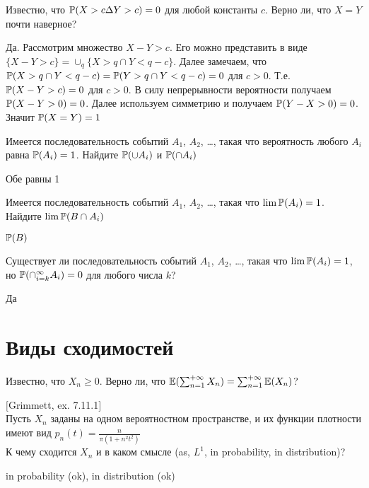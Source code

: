 \begin{problem}
Известно, что $ \P(X>c \Delta Y>c)=0 $ для любой константы $ c $. Верно ли, что $X=Y$ почти наверное?
\end{problem} 
\begin{solution} 
Да. Рассмотрим множество $ X-Y>c $. Его можно представить в виде $ \{X-Y>c\}=\cup_{q} \{ X>q \cap Y<q-c\} $. Далее замечаем, что $ \P(X>q \cap Y<q-c)=\P(Y>q \cap Y<q-c)=0 $ для $ c>0 $. Т.е. $ \P(X-Y>c)=0 $ для $ c>0 $. В силу непрерывности вероятности получаем $ \P(X-Y>0)=0 $. Далее используем симметрию и получаем $ \P(Y-X>0)=0 $. Значит $ \P(X=Y)=1 $
\end{solution}

\begin{problem}
Имеется последовательность событий $A_1$, $A_2$, \ldots, такая что вероятность любого $A_i$ равна $\P(A_i)=1$. Найдите $\P(\cup A_i)$ и $\P(\cap A_i)$
\end{problem} 
\begin{solution} 
Обе равны 1
\end{solution}

\begin{problem}
Имеется последовательность событий $A_1$, $A_2$, \ldots, такая что $\lim \P(A_i)=1$. Найдите $\lim \P(B\cap A_i)$
\end{problem} 
\begin{solution} 
$\P(B)$
\end{solution}

\begin{problem}
Существует ли последовательность событий $A_1$, $A_2$, \ldots, такая что $\lim \P(A_i)=1$, но $\P(\cap_{i=k}^{\infty} A_i)=0$ для любого числа $k$?
\end{problem} 
\begin{solution} 
Да
\end{solution}


\section{Виды сходимостей} 

\begin{problem}
Известно, что $X_{n} \ge 0$. Верно ли, что 
$\E(\sum_{n=1}^{+\infty}X_{n})=\sum_{n=1}^{+\infty}\E(X_{n})$?
\end{problem} 
\begin{solution} 

\end{solution}

\begin{problem}
$[$Grimmett, ex. 7.11.1$]$ \\
Пусть $X_{n}$ заданы на одном вероятностном пространстве, и их
функции плотности имеют вид
$p_{n}(t)=\frac{n}{\pi(1+n^{2}t^{2})}$ \\
К чему сходится $X_{n}$ и в каком смысле (as, $L^{1}$, in
probability, in distribution)? 
\end{problem} 
\begin{solution} 

in probability (ok), in distribution (ok) 
\end{solution}

